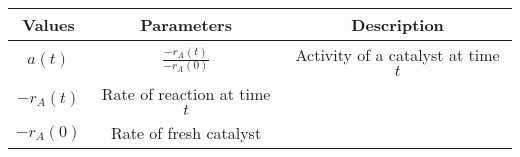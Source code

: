 
\begin{tabular}{|c|c|c|}
\hline
\textbf{Values} & \textbf{Parameters} & \textbf{Description} \\
\hline
$a(t)$ & $\frac{-r_A(t)}{-r_A(0)}$ & Activity of a catalyst at time $t$ \\
\hline
$-r_A(t)$ & Rate of reaction at time $t$ & \\
\hline
$-r_A(0)$ & Rate of fresh catalyst & \\
\hline
\end{tabular}




